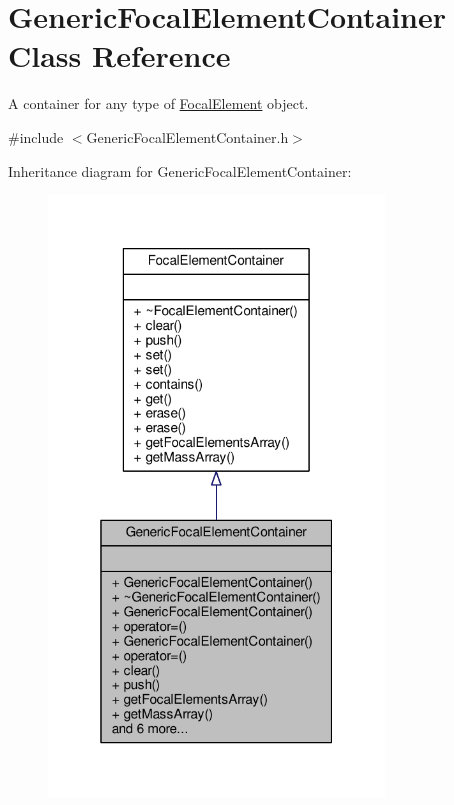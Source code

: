 \hypertarget{classGenericFocalElementContainer}{}\section{Generic\+Focal\+Element\+Container Class Reference}
\label{classGenericFocalElementContainer}


A container for any type of \hyperlink{classFocalElement}{Focal\+Element} object.  




{\ttfamily \#include $<$Generic\+Focal\+Element\+Container.\+h$>$}



Inheritance diagram for Generic\+Focal\+Element\+Container\+:\nopagebreak
\begin{figure}[H]
\begin{center}
\leavevmode
\includegraphics[width=253pt]{classGenericFocalElementContainer__inherit__graph}
\end{center}
\end{figure}


